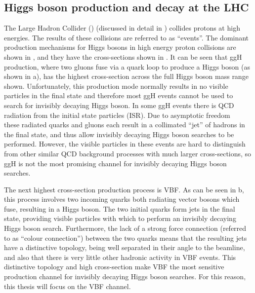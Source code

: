 \subsection{Higgs boson production and decay at the LHC}
\label{sec:higprod}
The Large Hadron Collider (\LHC) (discussed in detail in ) collides protons at high energies. The results of these collisions are referred to as ``events''. The dominant production mechanisms for Higgs bosons in high energy proton collisions are shown in , and they have the cross-sections shown in . It can be seen that \ac{ggH} production, where two gluons fuse via a quark loop to produce a Higgs boson (as shown in a), has the highest cross-section across the full Higgs boson mass range shown. Unfortunately, this production mode normally results in no visible particles in the final state and therefore most \ac{ggH} events cannot be used to search for invisibly decaying Higgs boson. In some \ac{ggH} events there is \ac{QCD} radiation from the initial state particles (\ac{ISR}). Due to asymptotic freedom ~\cite{PhysRevLett.30.1343,PhysRevLett.30.1346} these radiated quarks and gluons each result in a collimated ``jet'' of hadrons in the final state, and thus allow invisibly decaying Higgs boson searches to be performed. However, the visible particles in these events are hard to distinguish from other similar \ac{QCD} background processes with much larger cross-sections, so \ac{ggH} is not the most promising channel for invisibly decaying Higgs boson searches.

The next highest cross-section production process is \ac{VBF}. As can be seen in b, this process involves two incoming quarks both radiating vector bosons which fuse, resulting in a Higgs boson. The two initial quarks form jets in the final state, providing visible particles with which to perform an invisibly decaying Higgs boson search. Furthermore, the lack of a strong force connection (referred to as ``colour connection'') between the two quarks means that the resulting jets have a distinctive topology, being well separated in their angle to the beamline, and also that there is very little other hadronic activity in \ac{VBF} events. This distinctive topology and high cross-section make \ac{VBF} the most sensitive production channel for invisibly decaying Higgs boson searches. For this reason, this thesis will focus on the \ac{VBF} channel.

